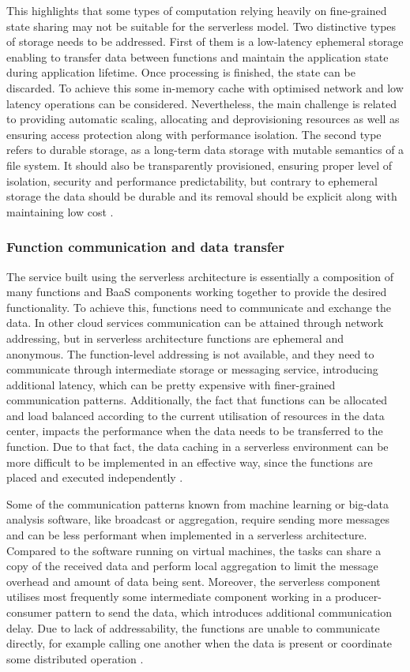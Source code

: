 This highlights that some types of computation relying heavily on fine-grained state sharing may not be suitable for the serverless model. Two distinctive types of storage needs to be addressed. First of them is a low-latency ephemeral storage enabling to transfer data between functions and maintain the application state during application lifetime. Once processing is finished, the state can be discarded. To achieve this some in-memory cache with optimised network and low latency operations can be considered. Nevertheless, the main challenge is related to providing automatic scaling, allocating and deprovisioning resources as well as ensuring access protection along with performance isolation. The second type refers to durable storage, as a long-term data storage with mutable semantics of a file system. It should also be transparently provisioned, ensuring proper level of isolation, security and performance predictability, but contrary to ephemeral storage the data should be durable and its removal should be explicit along with maintaining low cost \cite{BerkeleyServerless}.

\subsubsection{Function communication and data transfer}

The service built using the serverless architecture is essentially a composition of many functions and BaaS components working together to provide the desired functionality. To achieve this, functions need to communicate and exchange the data. In other cloud services communication can be attained through network addressing, but in serverless architecture functions are ephemeral and anonymous. The function-level addressing is not available, and they need to communicate through intermediate storage or messaging service, introducing additional latency, which can be pretty expensive with finer-grained communication patterns. Additionally, the fact that functions can be allocated and load balanced according to the current utilisation of resources in the data center, impacts the performance when the data needs to be transferred to the function. Due to that fact, the data caching in a serverless environment can be more difficult to be implemented in an effective way, since the functions are placed and executed independently \cite{ServerlessComputingSurveyOfOpportunitiesChallengesApplications}.

Some of the communication patterns known from machine learning or big-data analysis software, like broadcast or aggregation, require sending more messages and can be less performant when implemented in a serverless architecture. Compared to the software running on virtual machines, the tasks can share a copy of the received data and perform local aggregation to limit the message overhead and amount of data being sent. Moreover, the serverless component utilises most frequently some intermediate component working in a producer-consumer pattern to send the data, which introduces additional communication delay. Due to lack of addressability, the functions are unable to communicate directly, for example calling one another when the data is present or coordinate some distributed operation \cite{BerkeleyServerless}.

